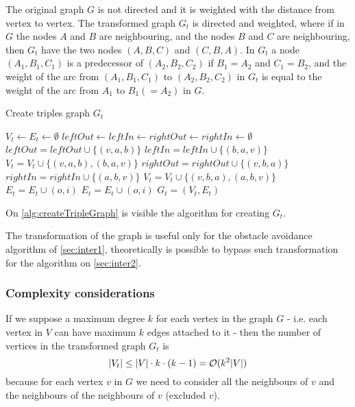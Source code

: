 \documentclass[dissertation.tex]{subfiles}
\begin{document}
The original graph $G$ is not directed and it is weighted
with the distance from vertex to vertex. The transformed graph $G_t$ is
directed and weighted, where if in $G$ the nodes $A$
and $B$ are
neighbouring, and the nodes $B$ and $C$ are neighbouring, then $G_t$
have the two nodes $(A,B,C)$ and $(C,B,A)$. In
$G_t$ a node $(A_1,B_1,C_1)$ is a predecessor of
$(A_2,B_2,C_2)$ if $B_1=A_2$ and $C_1=B_2$, and the weight of the arc
from $(A_1,B_1,C_1)$ to $(A_2,B_2,C_2)$ in $G_t$ is
equal to
the weight of the arc from $A_1$ to $B_1(=A_2)$ in $G$.

\begin{algorithm}
 \caption{Create triples graph $G_t$}\label{alg:createTripleGraph}
 \begin{algorithmic}[1]
   \State $V_t\gets E_t\gets \emptyset$
   \label{ln:tripleFor0}
   \State $leftOut\gets leftIn\gets rightOut\gets rightIn\gets \emptyset$
   \State $leftOut = leftOut\cup \{(v,a,b)\}$
   \State $leftIn = leftIn\cup \{(b,a,v)\}$
   \State $V_t = V_t\cup \{(v,a,b), (b,a,v)\}$
   \EndFor
   \State $rightOut = rightOut\cup \{(v,b,a)\}$
   \State $rightIn = rightIn\cup \{(a,b,v)\}$
   \State $V_t = V_t\cup \{(v,b,a), (a,b,v)\}$
   \EndFor
   \State $E_t = E_t\cup (o,i)$
   \EndFor
   \EndFor
   \label{ln:tripleFor1}
   \label{ln:tripleFor2}
   \State $E_t = E_t\cup (o,i)$
   \EndFor
   \EndFor
   \EndFor
   \State\Return $G_t=(V_t,E_t)$
   \EndProcedure
 \end{algorithmic}
\end{algorithm}
On \cref{alg:createTripleGraph} is visible the algorithm for creating
$G_t$.

The transformation of the graph is useful only for the obstacle
avoidance algorithm of
\cref{sec:inter1}, theoretically is possible to bypass such
transformation for the algorithm on \cref{sec:inter2}.

\subsubsection{Complexity considerations}
If we suppose a maximum degree $k$ for each vertex in the graph $G$ -
i.e. each vertex in $V$ can have maximum $k$ edges attached to
it - then the number of vertices in the transformed graph $G_t$ is 
\begin{equation}
  \label{eq:numTriples}
  |V_t|\leq |V|\cdot k\cdot(k-1)=\mathcal{O}(k^2|V|)
\end{equation}
because for each vertex $v$ in $G$ we need to
consider all the neighbours of $v$ and the neighbours of the neighbours
of $v$ (excluded $v$).
\end{document}
